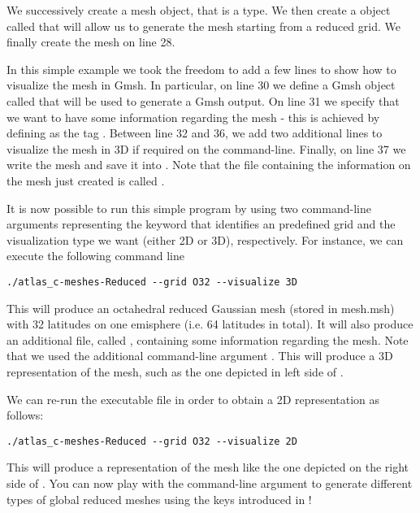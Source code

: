 We successively create a mesh object,  
that is a  type. We then create a 
 object called 
that will allow us to generate the mesh starting from
a reduced grid. We finally create the mesh on line 28.

In this simple example we took the freedom to add a few 
lines to show how to visualize the mesh in Gmsh. In particular, 
on line 30 we define a Gmsh object called  that 
will be used to generate a Gmsh output. On line 31 we specify 
that we want to have some information regarding the mesh - this 
is achieved by defining as  the tag .
Between line 32 and 36, we add two additional lines to visualize 
the mesh in 3D if required on the command-line.
Finally, on line 37 we write the mesh and save it into .
Note that the file containing the information on the mesh 
just created is called .

It is now possible to run this simple program by using 
two command-line arguments representing the keyword that 
identifies an \Atlas predefined grid and the visualization 
type we want (either 2D or 3D), respectively. For instance, 
we can execute the following command line
%
\begin{lstlisting}[style=BashStyle]
./atlas_c-meshes-Reduced --grid O32 --visualize 3D
\end{lstlisting}
% 
This will produce an octahedral reduced Gaussian mesh 
(stored in mesh.msh) with 32 latitudes on one emisphere 
(i.e. 64 latitudes in total). It will also produce an 
additional file, called , containing
some information regarding the mesh.
Note that we used the additional command-line argument 
. This will produce a 3D representation 
of the mesh, such as the one depicted in left side of 
.

We can re-run the executable file in order to obtain 
a 2D representation as follows:
%
\begin{lstlisting}[style=BashStyle]
./atlas_c-meshes-Reduced --grid O32 --visualize 2D
\end{lstlisting}
% 
This will produce a representation of the mesh like 
the one depicted on the right side of .
You can now play with the command-line argument to generate 
different types of global reduced meshes using the keys 
introduced in !




